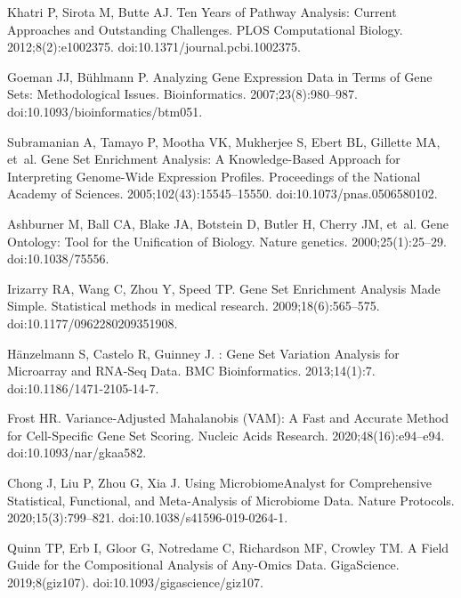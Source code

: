 \documentclass[10pt,letterpaper]{article}
\begin{document}
\begin{thebibliography}{10}
Khatri P, Sirota M, Butte AJ.
\newblock Ten {{Years}} of {{Pathway Analysis}}: Current {{Approaches}} and
  {{Outstanding Challenges}}.
\newblock PLOS Computational Biology. 2012;8(2):e1002375.
\newblock doi:{10.1371/journal.pcbi.1002375}.

Goeman JJ, B{\"u}hlmann P.
\newblock Analyzing Gene Expression Data in Terms of Gene Sets: Methodological
  Issues.
\newblock Bioinformatics. 2007;23(8):980--987.
\newblock doi:{10.1093/bioinformatics/btm051}.

Subramanian A, Tamayo P, Mootha VK, Mukherjee S, Ebert BL, Gillette MA, et~al.
\newblock Gene Set Enrichment Analysis: A Knowledge-Based Approach for
  Interpreting Genome-Wide Expression Profiles.
\newblock Proceedings of the National Academy of Sciences.
  2005;102(43):15545--15550.
\newblock doi:{10.1073/pnas.0506580102}.

Ashburner M, Ball CA, Blake JA, Botstein D, Butler H, Cherry JM, et~al.
\newblock Gene {{Ontology}}: Tool for the Unification of Biology.
\newblock Nature genetics. 2000;25(1):25--29.
\newblock doi:{10.1038/75556}.

Irizarry RA, Wang C, Zhou Y, Speed TP.
\newblock Gene {{Set Enrichment Analysis Made Simple}}.
\newblock Statistical methods in medical research. 2009;18(6):565--575.
\newblock doi:{10.1177/0962280209351908}.

H{\"a}nzelmann S, Castelo R, Guinney J.
: Gene Set Variation Analysis for Microarray and
  {{RNA}}-{{Seq}} Data.
\newblock BMC Bioinformatics. 2013;14(1):7.
\newblock doi:{10.1186/1471-2105-14-7}.

Frost HR.
\newblock Variance-Adjusted {{Mahalanobis}} ({{VAM}}): A Fast and Accurate
  Method for Cell-Specific Gene Set Scoring.
\newblock Nucleic Acids Research. 2020;48(16):e94--e94.
\newblock doi:{10.1093/nar/gkaa582}.

Chong J, Liu P, Zhou G, Xia J.
\newblock Using {{MicrobiomeAnalyst}} for Comprehensive Statistical,
  Functional, and Meta-Analysis of Microbiome Data.
\newblock Nature Protocols. 2020;15(3):799--821.
\newblock doi:{10.1038/s41596-019-0264-1}.

Quinn TP, Erb I, Gloor G, Notredame C, Richardson MF, Crowley TM.
\newblock A Field Guide for the Compositional Analysis of Any-Omics Data.
\newblock GigaScience. 2019;8(giz107).
\newblock doi:{10.1093/gigascience/giz107}.


\end{thebibliography}
\end{document}
